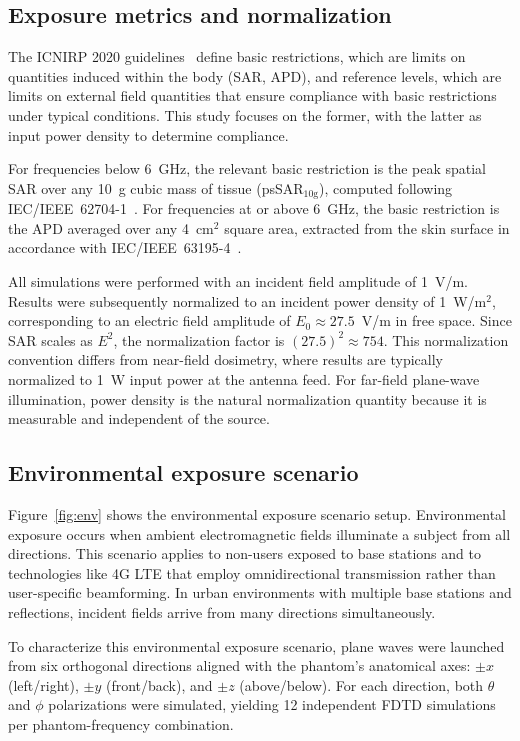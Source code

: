 \documentclass{iopjournal}
\begin{document}
\subsection{Exposure metrics and normalization}
The \gls{ICNIRP} 2020 guidelines~\citep{icnirp2020} define basic restrictions, which are limits on quantities induced within the body (\gls{SAR}, \gls{APD}), and reference levels, which are limits on external field quantities that ensure compliance with basic restrictions under typical conditions.
This study focuses on the former, with the latter as input power density to determine compliance.

For frequencies below 6~GHz, the relevant basic restriction is the peak spatial \gls{SAR} over any 10~g cubic mass of tissue (psSAR$_{10\mathrm{g}}$), computed following IEC/IEEE~62704-1~\citep{iec62704}.
For frequencies at or above 6~GHz, the basic restriction is the \gls{APD} averaged over any 4~cm$^2$ square area, extracted from the skin surface in accordance with IEC/IEEE~63195-4~\citep{iec63195}.

All simulations were performed with an incident field amplitude of 1~V/m.
Results were subsequently normalized to an incident power density of 1~W/m$^2$, corresponding to an electric field amplitude of $E_0 \approx 27.5$~V/m in free space.
Since \gls{SAR} scales as $E^2$, the normalization factor is $(27.5)^2 \approx 754$.
This normalization convention differs from near-field dosimetry, where results are typically normalized to 1~W input power at the antenna feed.
For far-field plane-wave illumination, power density is the natural normalization quantity because it is measurable and independent of the source.

\subsection{Environmental exposure scenario}
Figure~\ref{fig:env} shows the environmental exposure scenario setup.
Environmental exposure occurs when ambient electromagnetic fields illuminate a subject from all directions.
This scenario applies to non-users exposed to base stations and to technologies like 4G LTE that employ omnidirectional transmission rather than user-specific beamforming.
In urban environments with multiple base stations and reflections, incident fields arrive from many directions simultaneously.

To characterize this environmental exposure scenario, plane waves were launched from six orthogonal directions aligned with the phantom's anatomical axes: $\pm x$ (left/right), $\pm y$ (front/back), and $\pm z$ (above/below).
For each direction, both $\theta$ and $\phi$ polarizations were simulated, yielding 12 independent \gls{FDTD} simulations per phantom-frequency combination.
\end{document}
